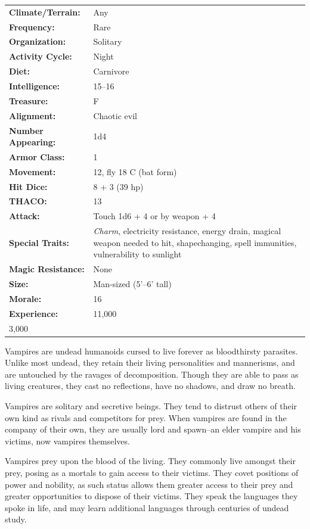 \begin{multicols}{2}
\begin{minipage}{\columnwidth}
\noindent \begin{tabular}{p{}p{}}
\textbf{Climate/Terrain:}	& Any	\\
\textbf{Frequency:} 		& Rare	\\
\textbf{Organization:} 		& Solitary	\\
\textbf{Activity Cycle:} 	& Night	\\
\textbf{Diet:} 				& Carnivore	\\
\textbf{Intelligence:} 		& 15--16	\\
\textbf{Treasure:} 			& F	\\
\textbf{Alignment:} 		& Chaotic evil	\\
\hline
\textbf{Number Appearing:} 	& 1d4	\\
\textbf{Armor Class:} 		& 1	\\
\textbf{Movement:} 			& 12, fly 18 C (bat form)	\\
\textbf{Hit Dice:} 			& 8 + 3 (39 hp)	\\
\textbf{THACO:} 			& 13	\\
\textbf{Attack:} 			& Touch 1d6 + 4 or by weapon + 4	\\
\textbf{Special Traits:} & \textit{Charm}, electricity resistance, energy drain, magical weapon needed to hit, shapechanging, spell immunities, vulnerability to sunlight 	\\
\textbf{Magic Resistance:} 	& None	\\
\textbf{Size:} 				& Man-sized (5'--6'	tall)	\\
\textbf{Morale:} 			& 16	\\
\textbf{Experience:} 		& 11,000	\\ 3,000
\end{tabular}

\end{minipage}

Vampires are undead humanoids cursed to live forever as bloodthirsty parasites. Unlike most undead, they retain their living personalities and mannerisms, and are untouched by the ravages of decomposition. Though they are able to pass as living creatures, they cast no reflections, have no shadows, and draw no breath.

Vampires are solitary and secretive beings. They tend to distrust others of their own kind as rivals and competitors for prey. When vampires are found in the company of their own, they are usually lord and spawn--an elder vampire and his victims, now vampires themselves.

Vampires prey upon the blood of the living. They commonly live amongst their prey, posing as a mortals to gain access to their victims. They covet positions of power and nobility, as such status allows them greater access to their prey and greater opportunities to dispose of their victims. They speak the languages they spoke in life, and may learn additional languages through centuries of undead study.


\end{multicols}
